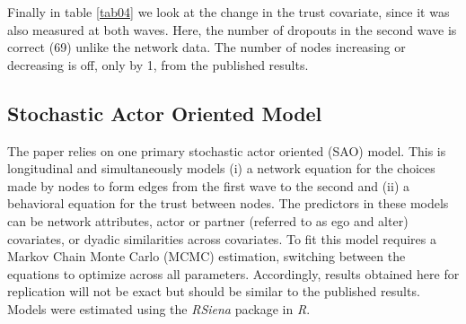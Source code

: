 \documentclass[12pt]{article} %
\numberwithin{equation}{section}		%
\numberwithin{figure}{section}			%
\numberwithin{table}{section}				%
\begin{document}
Finally in table \ref{tab04} we look at the change in the trust covariate, since it was also measured at both waves. Here, the number of dropouts in the second wave is correct (69) unlike the network data. The number of nodes increasing or decreasing is off, only by 1, from the published results.

\subsection{Stochastic Actor Oriented Model}
The paper relies on one primary stochastic actor oriented (SAO) model. This is longitudinal and simultaneously models (i) a network equation for the choices made by nodes to form edges from the first wave to the second and (ii) a behavioral equation for the trust between nodes. The predictors in these models can be network attributes, actor or partner (referred to as ego and alter) covariates, or dyadic similarities across covariates. To fit this model requires a Markov Chain Monte Carlo (MCMC) estimation, switching between the equations to optimize across all parameters. Accordingly, results obtained here for replication will not be exact but should be similar to the published results. Models were estimated using the \emph{RSiena} package in \emph{R}. 
\end{document}
